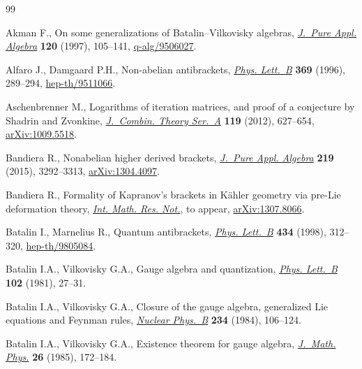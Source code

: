 \documentclass[pdftex]{sigma}
\numberwithin{equation}{section}
\begin{document}
\begin{thebibliography}{99}
\footnotesize\itemsep=0pt

Akman F., On some generalizations of {B}atalin--{V}ilkovisky algebras,
 \href{http://dx.doi.org/10.1016/S0022-4049(96)00036-9}{\textit{J.~Pure Appl. Algebra}} \textbf{120} (1997), 105--141,
 \href{http://arxiv.org/abs/q-alg/9506027}{q-alg/9506027}.

Alfaro J., Damgaard P.H., Non-abelian antibrackets, \href{http://dx.doi.org/10.1016/0370-2693(95)01533-7}{\textit{Phys. Lett.~B}}
 \textbf{369} (1996), 289--294, \href{http://arxiv.org/abs/hep-th/9511066}{hep-th/9511066}.

Aschenbrenner M., Logarithms of iteration matrices, and proof of a conjecture
 by {S}hadrin and {Z}vonkine, \href{http://dx.doi.org/10.1016/j.jcta.2011.11.008}{\textit{J.~Combin. Theory Ser.~A}} \textbf{119}
 (2012), 627--654, \href{http://arxiv.org/abs/1009.5518}{arXiv:1009.5518}.

Bandiera R., Nonabelian higher derived brackets, \href{http://dx.doi.org/10.1016/j.jpaa.2014.10.015}{\textit{J.~Pure Appl. Algebra}}
 \textbf{219} (2015), 3292--3313, \href{http://arxiv.org/abs/1304.4097}{arXiv:1304.4097}.

Bandiera R., Formality of {K}apranov's brackets in {K}\"{a}hler geometry via
 pre-{L}ie deformation theory, \href{http://dx.doi.org/10.1093/imrn/rnv362}{\textit{Int. Math. Res. Not.}}, to appear,
 \href{http://arxiv.org/abs/1307.8066}{arXiv:1307.8066}.

Batalin I., Marnelius R., Quantum antibrackets, \href{http://dx.doi.org/10.1016/S0370-2693(98)00709-6}{\textit{Phys. Lett.~B}}
 \textbf{434} (1998), 312--320, \href{http://arxiv.org/abs/hep-th/9805084}{hep-th/9805084}.

Batalin I.A., Vilkovisky G.A., Gauge algebra and quantization, \href{http://dx.doi.org/10.1016/0370-2693(81)90205-7}{\textit{Phys.
 Lett.~B}} \textbf{102} (1981), 27--31.

Batalin I.A., Vilkovisky G.A., Closure of the gauge algebra, generalized {L}ie
 equations and {F}eynman rules, \href{http://dx.doi.org/10.1016/0550-3213(84)90227-X}{\textit{Nuclear Phys.~B}} \textbf{234} (1984),
 106--124.

Batalin I.A., Vilkovisky G.A., Existence theorem for gauge algebra, \href{http://dx.doi.org/10.1063/1.526780}{\textit{J.~Math. Phys.}} \textbf{26} (1985), 172--184.


\end{thebibliography}
\end{document}
